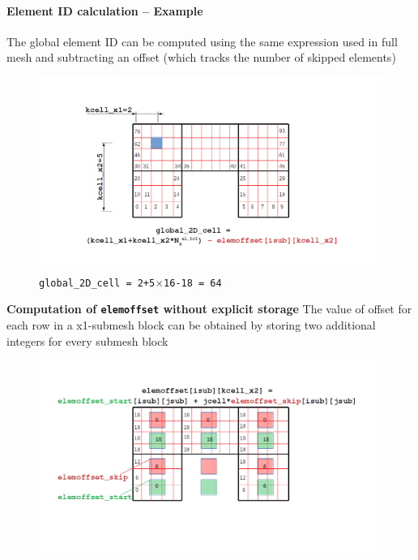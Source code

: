 \documentclass[a4paper,12pt]{article}
\begin{document}
\paragraph{Element ID calculation -- Example}
The global element ID can be computed using the same expression used in full mesh and subtracting an offset (which tracks the number of skipped elements)
\begin{figure}[H]
	\centering
	\includegraphics[trim=140 20 140 80,clip,scale=0.35]{figures/InactiveMesh_ElemIDCalc.png}
	\caption{\texttt{global\_2D\_cell = 2+5$\times$16-18 = 64}}			
\end{figure}

\noindent\textbf{Computation of \texttt{elemoffset} without explicit storage}
The value of offset for each row in a x1-submesh block can be obtained by storing two additional integers for every submesh block
\begin{figure}[H]
	\centering
	\includegraphics[trim=50 100 80 80,clip,scale=0.35]{figures/ElemOffsetCalc.png}		
\end{figure}
\end{document}
